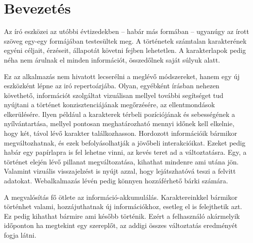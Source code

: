 \chapter{Bevezetés}
\label{ch:intro}

Az író eszközei az utóbbi évtizedekben -- habár más formában -- ugyanúgy az írott szöveg egy-egy formájában testesültek meg. A történetek számtalan karakterének egyéni céljait, érzéseit, állapotát követni fejben lehetetlen. A karakterlapok pedig néha nem árulnak el minden információt, összedőlnek saját súlyuk alatt.

Ez az alkalmazás nem hivatott lecserélni a meglévő módszereket, hanem egy új eszközként lépne az iró repertoárjába. Olyan, egyébként írásban nehezen követhető, információt szolgáltat vizuálisan mellyel további segítséget tud nyújtani a történet konzisztenciájának megőrzésére, az ellentmondások elkerülésére. Ilyen például a karakterek térbeli pozíciójának és sebességének a nyílvántartása, mellyel pontosan meghatározható mennyi időnek kell elkelnie, hogy két, távol lévő karakter találkozhasson. Hordozott információik bármikor megváltozhatnak, és ezek befolyásolhatják a jövőbeli interakcióikat. Ezeket pedig habár egy papírlapra is fel lehetne vinni, az kevés teret ad a változtatásra. Egy, a történet elején lévő pillanat megváltozatása, kihathat mindenre ami utána jön. Valamint vizuális visszajelzést is nyújt azzal, hogy lejátszhatóvá teszi a felvitt adatokat. Webalkalmazás lévén pedig könnyen hozzáférhető bárki számára.

A megvalósítás fő ötlete az információ-akkumulálás. Karaktereinkkel bármikor történhet valami, hozzájuthatnak új információkhoz, esetleg el is felejthetik azt. Ez pedig kihathat bármire ami később történik. Ezért a felhasználó akármelyik időponton ha megtekint egy szereplőt, az addigi összes változtatás eredményét fogja látni.
